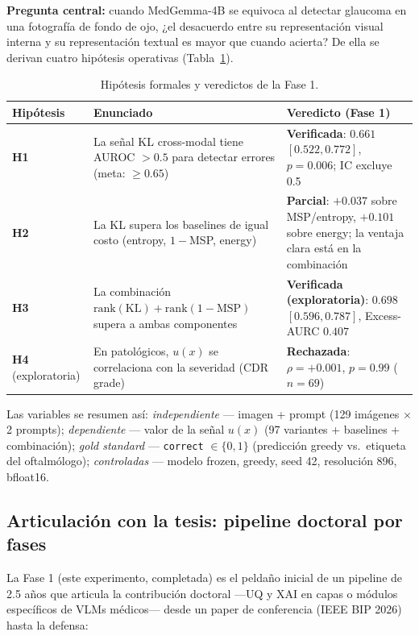 \documentclass[12pt,a4paper]{article}
\newcommand{\ux}{u(x)}
\begin{document}
\textbf{Pregunta central:} cuando MedGemma-4B se equivoca al detectar
glaucoma en una fotografía de fondo de ojo, ¿el desacuerdo entre su
representación visual interna y su representación textual es mayor que
cuando acierta? De ella se derivan cuatro hipótesis operativas
(Tabla~\ref{tab:hipotesis}).

\begin{table}[H]
\centering
\small
\caption{Hipótesis formales y veredictos de la Fase 1.}
\label{tab:hipotesis}
\begin{tabularx}{\textwidth}{lXX}
\toprule
\textbf{Hipótesis} & \textbf{Enunciado} & \textbf{Veredicto (Fase 1)} \\
\midrule
\textbf{H1} & La señal KL cross-modal tiene AUROC $> 0.5$ para detectar errores (meta: $\geq 0.65$) & \textbf{Verificada}: $0.661$ $[0.522, 0.772]$, $p = 0.006$; IC excluye 0.5 \\
\textbf{H2} & La KL supera los baselines de igual costo (entropy, $1-$MSP, energy) & \textbf{Parcial}: $+0.037$ sobre MSP/entropy, $+0.101$ sobre energy; la ventaja clara está en la combinación \\
\textbf{H3} & La combinación $\mathrm{rank}(\mathrm{KL}) + \mathrm{rank}(1-\mathrm{MSP})$ supera a ambas componentes & \textbf{Verificada (exploratoria)}: $0.698$ $[0.596, 0.787]$, Excess-AURC $0.407$ \\
\textbf{H4} (exploratoria) & En patológicos, $\ux$ se correlaciona con la severidad (CDR grade) & \textbf{Rechazada}: $\rho = +0.001$, $p = 0.99$ ($n = 69$) \\
\bottomrule
\end{tabularx}
\end{table}

Las variables se resumen así: \emph{independiente} --- imagen + prompt (129
imágenes $\times$ 2 prompts); \emph{dependiente} --- valor de la señal
$\ux$ (97 variantes + baselines + combinación); \emph{gold standard} ---
\texttt{correct} $\in \{0,1\}$ (predicción greedy vs.\ etiqueta del
oftalmólogo); \emph{controladas} --- modelo frozen, greedy, seed 42,
resolución 896, bfloat16.

\subsection{Articulación con la tesis: pipeline doctoral por fases}
\label{sec:roadmap}

La Fase 1 (este experimento, completada) es el peldaño inicial de un
pipeline de 2.5 años que articula la contribución doctoral ---UQ y XAI en
capas o módulos específicos de VLMs médicos--- desde un paper de
conferencia (IEEE BIP 2026) hasta la defensa:
\end{document}
